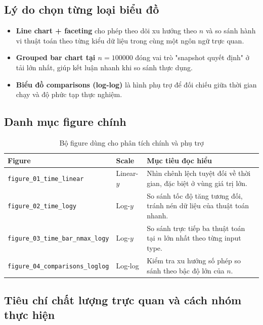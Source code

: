 \subsection{Lý do chọn từng loại biểu đồ}

\begin{itemize}[leftmargin=1.2cm]
    \item \textbf{Line chart + faceting} cho phép theo dõi xu hướng theo $n$ và so sánh hành vi thuật toán theo từng kiểu dữ liệu trong cùng một ngôn ngữ trực quan.
    \item \textbf{Grouped bar chart tại $n=100000$} đóng vai trò "snapshot quyết định" ở tải lớn nhất, giúp kết luận nhanh khi so sánh thực dụng.
    \item \textbf{Biểu đồ comparisons (log-log)} là hình phụ trợ để đối chiếu giữa thời gian chạy và độ phức tạp thực nghiệm.
\end{itemize}

\subsection{Danh mục figure chính}

\begin{table}[H]
\centering
\renewcommand{\arraystretch}{1.2}
\begin{tabular}{p{4.4cm}p{2.3cm}p{6.8cm}}
\toprule
\textbf{Figure} & \textbf{Scale} & \textbf{Mục tiêu đọc hiểu} \\
\midrule
\texttt{figure\_01\_time\_linear} & Linear-$y$ & Nhìn chênh lệch tuyệt đối về thời gian, đặc biệt ở vùng giá trị lớn. \\
\texttt{figure\_02\_time\_logy} & Log-$y$ & So sánh tốc độ tăng tương đối, tránh nén dữ liệu của thuật toán nhanh. \\
\texttt{figure\_03\_time\_bar\_nmax\_logy} & Log-$y$ & So sánh trực tiếp ba thuật toán tại $n$ lớn nhất theo từng input type. \\
\texttt{figure\_04\_comparisons\_loglog} & Log-log & Kiểm tra xu hướng số phép so sánh theo bậc độ lớn của $n$. \\
\bottomrule
\end{tabular}
\caption{Bộ figure dùng cho phân tích chính và phụ trợ}
\label{tab:figure-catalog}
\end{table}

\subsection{Tiêu chí chất lượng trực quan và cách nhóm thực hiện}


